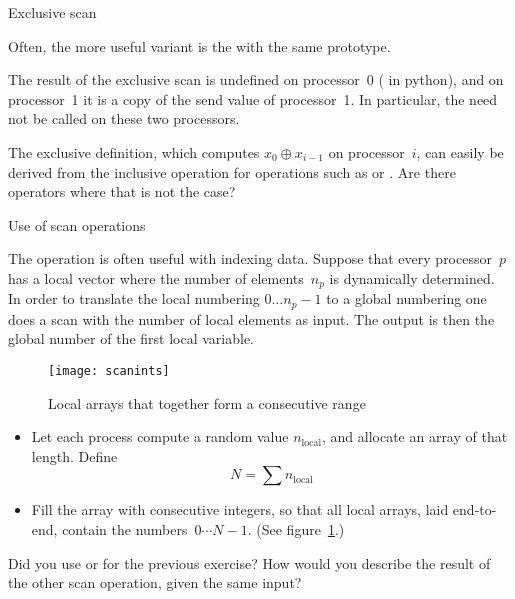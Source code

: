  {Exclusive scan}
\label{sec:mpi-exscan}

Often, the more useful variant is the 
%
%
with the same prototype. 

The result of the exclusive scan is undefined on processor~0
( in python),
and on processor~1 it is a copy of the send value of processor~1.
In particular, the  need not be called on these two 
processors.

\begin{exercise}
  The exclusive definition, which computes $x_0\oplus x_{i-1}$ on
  processor~$i$, can easily be derived from the inclusive operation
  for operations such as  or
  .  Are there operators where that is not the
  case?
\end{exercise}

 {Use of scan operations}

The  operation is often useful with indexing data. Suppose that
every processor~$p$ has a local vector where the number of elements~$n_p$ is dynamically 
determined. In order to translate the local numbering $0\ldots n_p-1$ to a global numbering
one does a scan with the number of local elements as input. The output is then the global 
number of the first local variable.

\begin{figure}[ht]
  \texttt{[image: scanints]}
  \caption{Local arrays that together form a consecutive range}
  \label{fig:scanints}
\end{figure}

\begin{exercise}
  \label{ex:scanprint}
  \begin{itemize}
  \item Let each process compute a random value $n_{\scriptstyle\mathrm{local}}$,
    and allocate an array of that length.
    Define \[ N=\sum n_{\scriptstyle\mathrm{local}} \]
  \item Fill the array with consecutive integers, so that all local arrays,
    laid end-to-end,
    contain the numbers~$0\cdots N-1$. (See figure~\ref{fig:scanints}.)
  \end{itemize}
\end{exercise}

\begin{exercise}
  Did you use  or  for
  the previous exercise?
  How would you describe the result of the other scan operation, given the
  same input?
\end{exercise}

